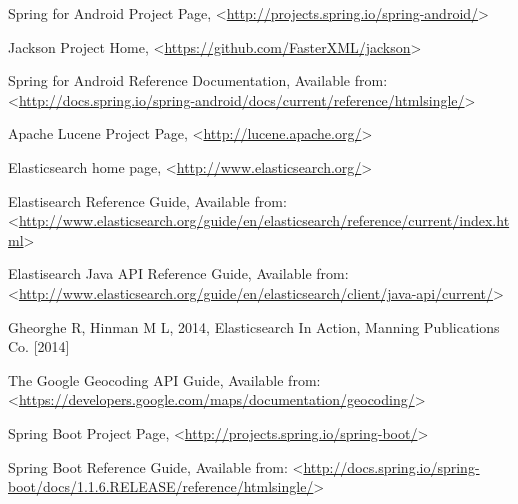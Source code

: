 \begin{thebibliography}{99}
 Spring for Android Project Page, <\url{http://projects.spring.io/spring-android/}>

Jackson Project Home, <\url{https://github.com/FasterXML/jackson}>

 Spring for Android Reference Documentation, Available from: <\url{http://docs.spring.io/spring-android/docs/current/reference/htmlsingle/}>

 Apache Lucene Project Page, <\url{http://lucene.apache.org/}>

 Elasticsearch home page, <\url{http://www.elasticsearch.org/}>

 Elastisearch Reference Guide, Available from: <\url{http://www.elasticsearch.org/guide/en/elasticsearch/reference/current/index.html}>

 Elastisearch Java API Reference Guide, Available from:
<\url{http://www.elasticsearch.org/guide/en/elasticsearch/client/java-api/current/}>

 Gheorghe R, Hinman M L, 2014, Elasticsearch In Action, Manning Publications Co. [2014]

 The Google Geocoding API Guide, Available from: <\url{https://developers.google.com/maps/documentation/geocoding/}>

 Spring Boot Project Page, <\url{http://projects.spring.io/spring-boot/}>

 Spring Boot Reference Guide, Available from: <\url{http://docs.spring.io/spring-boot/docs/1.1.6.RELEASE/reference/htmlsingle/}>

\end{thebibliography}